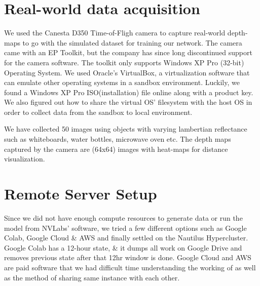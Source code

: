 \documentclass[runningheads]{llncs}
\begin{document}





\newpage
\appendix
    
\section{Real-world data acquisition}

We used the Canesta D350 Time-of-Fligh camera to capture real-world depth-maps to go with the simulated dataset for training our network. The camera came with an EP Toolkit, but the company has since long discontinued support for the camera software. The toolkit only supports Windows XP Pro (32-bit) Operating System. We used Oracle's VirtualBox, a virtualization software that can emulate other operating systems in a sandbox environment. Luckily, we  found a Windows XP Pro ISO(installation) file online along with a product key. We also figured out how to share the virtual OS' filesystem with the host OS in order to collect data from the sandbox to local environment. 

We have collected 50 images using objects with varying lambertian reflectance such as whiteboards, water bottles, microwave oven etc. The depth maps captured by the camera are (64x64) images with heat-maps for distance visualization.

\section{Remote Server Setup}

Since we did not have enough compute resources to generate data or run the model from NVLabs' software, we tried a few different options such as Google Colab, Google Cloud \& AWS and finally settled on the Nautilus Hypercluster. Google Colab has a 12-hour state, \& it dumps all work on Google Drive and removes previous state after that 12hr window is done. Google Cloud and AWS are paid software that we had difficult time understanding the working of as well as the method of sharing same instance with each other.
\end{document}
